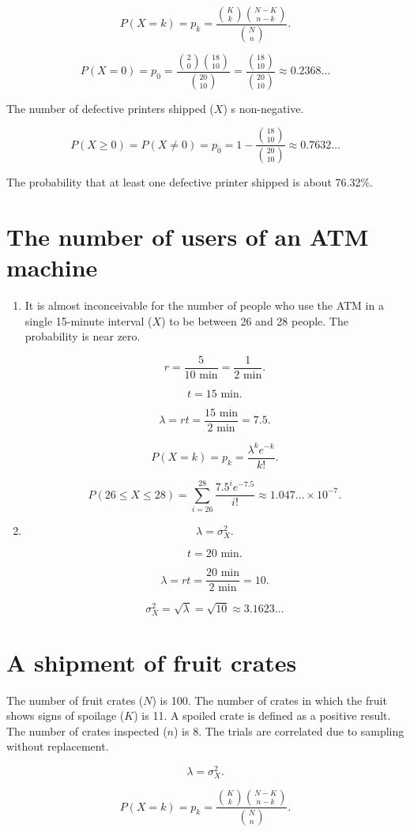 \documentclass[12pt]{article}
\begin{document}
\[P(X=k)=p_k=\frac{\binom{K}{k}\binom{N-K}{n-k}}{\binom{N}{n}}.\]

\[P(X=0)=p_0=\frac{\binom{2}{0}\binom{18}{10}}{\binom{20}{10}}=\frac{\binom{18}{10}}{\binom{20}{10}}\approx0.2368\dots\]

The number of defective printers shipped ($X$) s non-negative.

\[P(X\geq 0)=P(X\neq 0)=p_{\bar{0}}=1-\frac{\binom{18}{10}}{\binom{20}{10}}\approx 0.7632\dots\]

The probability that at least one defective printer shipped is about 76.32\%.
\section{The number of users of an ATM machine}
\begin{enumerate}
\item
It is almost inconceivable for the number of people who use the ATM in a single 15-minute interval ($X$) to be between 26 and 28 people. The probability is near zero. 

\[r=\frac{5}{10\text{ min}}=\frac{1}{2\text{ min}}.\]

\[t=15\text{ min}.\]

\[\lambda=rt=\frac{15\text{ min}}{2\text{ min}}=7.5.\]

\[P(X=k)=p_k=\frac{\lambda^ke^{-k}}{k!}.\]

\[P(26\leq X\leq 28)=\sum^{28}_{i=26}{\frac{7.5^ie^{-7.5}}{i!}}\approx 1.047\dotsc\times 10^{-7}.\]

\item
\[\lambda=\sigma^2_X.\]

\[t=20\text{ min}.\]

\[\lambda=rt=\frac{20\text{ min}}{2\text{ min}}=10.\]

\[\sigma^2_X=\sqrt{\lambda}=\sqrt{10}\approx 3.1623\dots\]
\end{enumerate}
\section{A shipment of fruit crates}
The number of fruit crates ($N$) is 100. The number of crates in which the fruit shows signs of spoilage ($K$) is 11. A spoiled crate is defined as a positive result. The number of crates inspected ($n$) is 8. The trials are correlated due to sampling without replacement.

\[\lambda=\sigma^2_X.\]

\[P(X=k)=p_k=\frac{\binom{K}{k}\binom{N-K}{n-k}}{\binom{N}{n}}.\]
\end{document}
